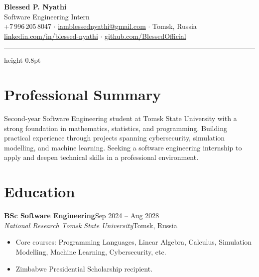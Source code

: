\documentclass[11pt,a4paper]{article}
\newcommand{\entry}[4]{%
  \textbf{#1}\hfill{\color{MedGray}#2}\\[0.05em]
  {\color{MedGray}\itshape #3}\hfill{\color{MedGray}#4}\par\vspace{0.15em}
}
\begin{document}
\begin{center}
  {\fontsize{28}{34}\selectfont\bfseries\color{NavyBlue}Blessed P. Nyathi}\\[0.5em]
  {\large Software Engineering Intern}\\[0.7em]
  {\color{MedGray}
    \enspace +7\,996\,205\,8047 \quad$\cdot$\quad
    \enspace \href{mailto:iamblessednyathi@gmail.com}{iamblessednyathi@gmail.com} \quad$\cdot$\quad
    \enspace Tomsk, Russia
  }\\[0.3em]
  {\color{MedGray}
    \enspace \href{https://www.linkedin.com/in/blessed-nyathi}{linkedin.com/in/blessed-nyathi} \quad$\cdot$\quad
    \enspace \href{https://github.com/BlessedOfficial}{github.com/BlessedOfficial}
  }
\end{center}

\vspace{0.2em}
{\color{RuleGray}\hrule height 0.8pt}

\section*{Professional Summary}

Second-year Software Engineering student at Tomsk State University with a strong foundation in mathematics, statistics, and programming. Building practical experience through projects spanning cybersecurity, simulation modelling, and machine learning. Seeking a software engineering internship to apply and deepen technical skills in a professional environment.

\section*{Education}

\entry{BSc Software Engineering}{Sep 2024 -- Aug 2028}
{National Research Tomsk State University}{Tomsk, Russia}
\begin{itemize}
  \item Core courses: Programming Languages, Linear Algebra, Calculus, Simulation Modelling, Machine Learning, Cybersecurity, etc.
  \item Zimbabwe Presidential Scholarship recipient.
\end{itemize}
\end{document}
